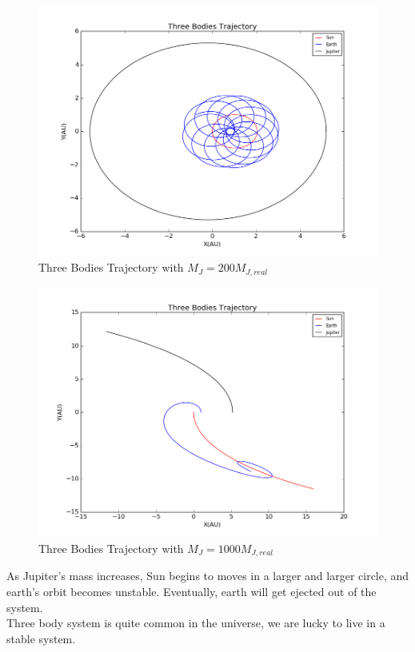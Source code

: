 \documentclass[10pt,a4paper]{article}
\begin{document}
    \begin{figure}[htbp]
    	\centering
    	\includegraphics[width=5in]{threebodies_8.png}
    	\caption{Three Bodies Trajectory with $M_J=200M_{J,real}$}
    \end{figure}
    \begin{figure}[htbp]
    	\centering
    	\includegraphics[width=5in]{threebodies_7.png}
    	\caption{Three Bodies Trajectory with $M_J=1000M_{J,real}$}
    \end{figure}
    As Jupiter's mass increases, Sun begins to moves in a larger and larger circle, and earth's orbit becomes unstable. Eventually, earth will get ejected out of the system.\\
    Three body system is quite common in the universe, we are lucky to live in a stable system.
\end{document}
